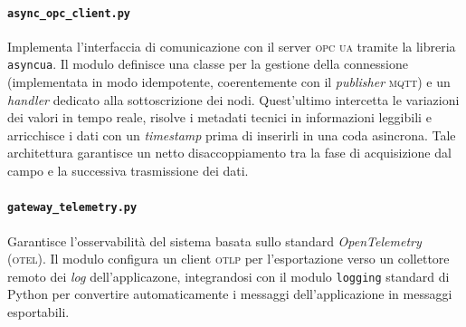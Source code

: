 \documentclass[12pt]{article}
\begin{document}
    \paragraph{\texttt{async\_opc\_client.py}} Implementa l'interfaccia di comunicazione con il server \textsc{opc ua} tramite la libreria \verb|asyncua|. Il modulo definisce una classe per la gestione della connessione (implementata in modo idempotente, coerentemente con il \textit{publisher} \textsc{mqtt}) e un \textit{handler} dedicato alla sottoscrizione dei nodi. Quest'ultimo intercetta le variazioni dei valori in tempo reale, risolve i metadati tecnici in informazioni leggibili e arricchisce i dati con un \textit{timestamp} prima di inserirli in una coda asincrona. Tale architettura garantisce un netto disaccoppiamento tra la fase di acquisizione dal campo e la successiva trasmissione dei dati.

    \paragraph{\texttt{gateway\_telemetry.py}} Garantisce l'osservabilità del sistema basata sullo standard \textit{OpenTelemetry} (\textsc{otel}). Il modulo configura un client \textsc{otlp} per l'esportazione verso un collettore remoto dei \textit{log} dell'applicazone, integrandosi con il modulo \verb|logging| standard di Python per convertire automaticamente i messaggi dell'applicazione in messaggi esportabili.
\end{document}
